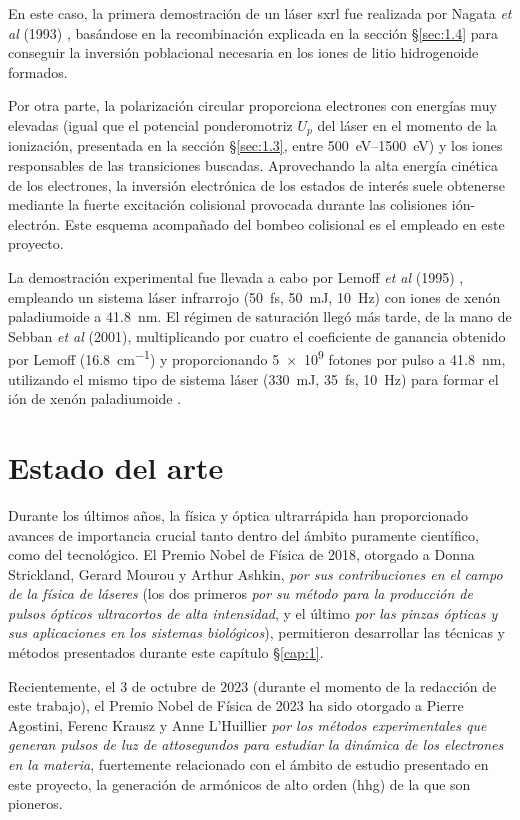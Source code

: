 En este caso, la primera demostración de un láser \acrshort{sxrl} fue realizada por Nagata \emph{et al} (1993) \autocite{Nagata1993}, basándose en la recombinación explicada en la sección \S\ref{sec:1.4} para conseguir la inversión poblacional necesaria en los iones de litio hidrogenoide  formados.

Por otra parte, la polarización circular proporciona electrones con energías muy elevadas (igual que el potencial ponderomotriz $U_{p}$ del láser en el momento de la ionización, presentada en la sección \S\ref{sec:1.3}, entre \qtyrange{500}{1500}{eV}) y los iones responsables de las transiciones buscadas. Aprovechando la alta energía cinética de los electrones, la inversión electrónica de los estados de interés suele obtenerse mediante la fuerte excitación colisional provocada durante las colisiones ión-electrón. Este esquema acompañado del bombeo colisional es el empleado en este proyecto.

La demostración experimental fue llevada a cabo por Lemoff \emph{et al} (1995) \autocite{Lemoff1995}, empleando un sistema láser  infrarrojo (\qty{50}{fs}, \qty{50}{mJ}, \qty{10}{Hz}) con iones de xenón paladiumoide  a \qty{41.8}{nm}. El régimen de saturación llegó más tarde, de la mano de Sebban \emph{et al} (2001)\autocite{Sebban2001}, multiplicando por cuatro el coeficiente de ganancia obtenido por Lemoff (\qty{16.8}{cm^{-1}}) y proporcionando \num{5e9} fotones por pulso a \qty{41.8}{nm}, utilizando el mismo tipo de sistema láser  (\qty{330}{mJ}, \qty{35}{fs}, \qty{10}{Hz}) para formar el ión de xenón paladiumoide .

\section{Estado del arte}\label{sec:1.5}
Durante los últimos años, la física y óptica ultrarrápida han proporcionado avances de importancia crucial tanto dentro del ámbito puramente científico, como del tecnológico. El Premio Nobel de Física de 2018, otorgado a Donna Strickland, Gerard Mourou y Arthur Ashkin, \emph{por sus contribuciones en el campo de la física de láseres} (los dos primeros \emph{por su método para la producción de pulsos ópticos ultracortos de alta intensidad}, y el último \emph{por las pinzas ópticas y sus aplicaciones en los sistemas biológicos}), permitieron desarrollar las técnicas y métodos presentados durante este capítulo \S\ref{cap:1}.

Recientemente, el 3 de octubre de $2023$ (durante el momento de la redacción de este trabajo), el Premio Nobel de Física de 2023 ha sido otorgado a Pierre Agostini, Ferenc Krausz y Anne L'Huillier \emph{por los métodos experimentales que generan pulsos de luz de attosegundos para estudiar la dinámica de los electrones en la materia}, fuertemente relacionado con el ámbito de estudio presentado en este proyecto, la generación de armónicos de alto orden (\acrshort{hhg}) de la que son pioneros.

